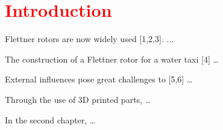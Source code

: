%
%

\chapter{\textcolor{red}{Introduction}}


Flettner rotors are now widely used [1,2,3]. $\ldots$

\bigskip

The construction of a Flettner rotor for a water taxi [4] \ldots

\bigskip


External influences pose great challenges to [5,6] \ldots

\bigskip

Through the use of 3D printed parts, \ldots

\bigskip

In the second chapter, \ldots
